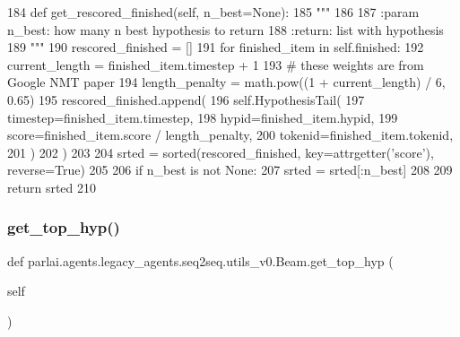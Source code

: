 \begin{DoxyCode}
184     \textcolor{keyword}{def }get\_rescored\_finished(self, n\_best=None):
185         \textcolor{stringliteral}{"""}
186 \textcolor{stringliteral}{}
187 \textcolor{stringliteral}{        :param n\_best: how many n best hypothesis to return}
188 \textcolor{stringliteral}{        :return: list with hypothesis}
189 \textcolor{stringliteral}{        """}
190         rescored\_finished = []
191         \textcolor{keywordflow}{for} finished\_item \textcolor{keywordflow}{in} self.finished:
192             current\_length = finished\_item.timestep + 1
193             \textcolor{comment}{# these weights are from Google NMT paper}
194             length\_penalty = math.pow((1 + current\_length) / 6, 0.65)
195             rescored\_finished.append(
196                 self.HypothesisTail(
197                     timestep=finished\_item.timestep,
198                     hypid=finished\_item.hypid,
199                     score=finished\_item.score / length\_penalty,
200                     tokenid=finished\_item.tokenid,
201                 )
202             )
203 
204         srted = sorted(rescored\_finished, key=attrgetter(\textcolor{stringliteral}{'score'}), reverse=\textcolor{keyword}{True})
205 
206         \textcolor{keywordflow}{if} n\_best \textcolor{keywordflow}{is} \textcolor{keywordflow}{not} \textcolor{keywordtype}{None}:
207             srted = srted[:n\_best]
208 
209         \textcolor{keywordflow}{return} srted
210 
\end{DoxyCode}
\mbox{\label{classparlai_1_1agents_1_1legacy__agents_1_1seq2seq_1_1utils__v0_1_1Beam_abbb522afdc69dbce77f997dd392c5c1d}} 
\subsubsection{\texorpdfstring{get\+\_\+top\+\_\+hyp()}{get\_top\_hyp()}}
{\footnotesize\ttfamily def parlai.\+agents.\+legacy\+\_\+agents.\+seq2seq.\+utils\+\_\+v0.\+Beam.\+get\+\_\+top\+\_\+hyp (\begin{DoxyParamCaption}\item[{}]{self }\end{DoxyParamCaption})}

